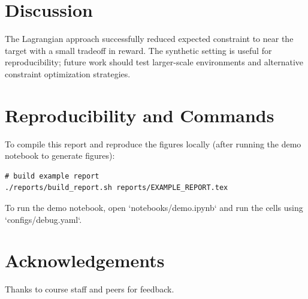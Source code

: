 \documentclass[11pt]{article}
\begin{document}
\section{Discussion}
The Lagrangian approach successfully reduced expected constraint to near the target with a small tradeoff in reward. The synthetic setting is useful for reproducibility; future work should test larger-scale environments and alternative constraint optimization strategies.

\section*{Reproducibility and Commands}
To compile this report and reproduce the figures locally (after running the demo notebook to generate figures):
\begin{verbatim}
# build example report
./reports/build_report.sh reports/EXAMPLE_REPORT.tex
\end{verbatim}
To run the demo notebook, open `notebooks/demo.ipynb` and run the cells using `configs/debug.yaml`.

\section*{Acknowledgements}
Thanks to course staff and peers for feedback.



\end{document}
